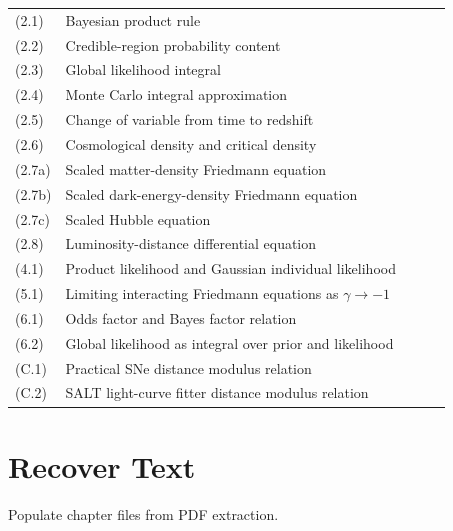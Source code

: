 \documentclass{article}
\newcommand{\done}{\textcolor{green!60!black}{\ding{51}}}
\begin{document}
\begin{longtable}{|p{1.8cm}|p{6.2cm}|p{2.2cm}|p{2.2cm}|p{2.5cm}|}
(2.1) & Bayesian product rule & \done & \done & \\
(2.2) & Credible-region probability content & \done & \done & \\
(2.3) & Global likelihood integral & \done & \done & \\
(2.4) & Monte Carlo integral approximation & \done & \done & \\
(2.5) & Change of variable from time to redshift & \done & \done & \\
(2.6) & Cosmological density and critical density & \done & \done & \\
(2.7a) & Scaled matter-density Friedmann equation & \done & \done & \\
(2.7b) & Scaled dark-energy-density Friedmann equation & \done & \done & \\
(2.7c) & Scaled Hubble equation & \done & \done & \\
(2.8) & Luminosity-distance differential equation & \done & \done & \\

(4.1) & Product likelihood and Gaussian individual likelihood & \done & \done & \\

(5.1) & Limiting interacting Friedmann equations as $\gamma \to -1$ & \done & \done & \\

(6.1) & Odds factor and Bayes factor relation & \done & \done & \\
(6.2) & Global likelihood as integral over prior and likelihood & \done & \done & \\

(C.1) & Practical SNe distance modulus relation & \done & \done & \\
(C.2) & SALT light-curve fitter distance modulus relation & \done & \done & \\

\hline
\end{longtable}

\section{\done Recover Text}

Populate chapter files from PDF extraction.
\end{document}
